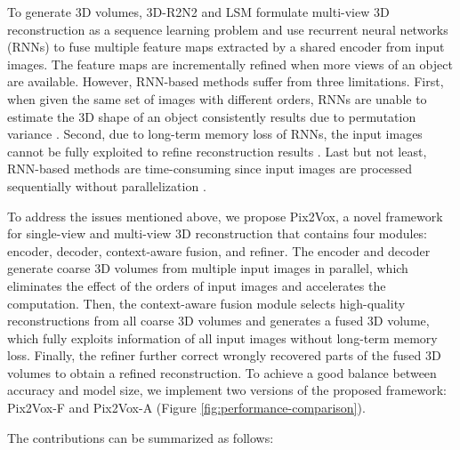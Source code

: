 \documentclass[10pt,twocolumn,letterpaper]{article}
\begin{document}
To generate 3D volumes, 3D-R2N2 \cite{DBLP:conf/eccv/ChoyXGCS16} and LSM \cite{DBLP:conf/nips/KarHM17} formulate multi-view 3D reconstruction as a sequence learning problem and use recurrent neural networks (RNNs) to fuse multiple feature maps extracted by a shared encoder from input images.
The feature maps are incrementally refined when more views of an object are available.
However, RNN-based methods suffer from three limitations.
First, when given the same set of images with different orders, RNNs are unable to estimate the 3D shape of an object consistently results due to permutation variance \cite{DBLP:conf/iclr/VinyalsBK16}.
Second, due to long-term memory loss of RNNs, the input images cannot be fully exploited to refine reconstruction results \cite{DBLP:conf/icml/PascanuMB13}.
Last but not least, RNN-based methods are time-consuming since input images are processed sequentially without parallelization \cite{DBLP:conf/icassp/HwangS15}.
 
To address the issues mentioned above, we propose Pix2Vox, a novel framework for single-view and multi-view 3D reconstruction that contains four modules: encoder, decoder, context-aware fusion, and refiner.
The encoder and decoder generate coarse 3D volumes from multiple input images in parallel, which eliminates the effect of the orders of input images and accelerates the computation.
Then, the context-aware fusion module selects high-quality reconstructions from all coarse 3D volumes and generates a fused 3D volume, which fully exploits information of all input images without long-term memory loss.
Finally, the refiner further correct wrongly recovered parts of the fused 3D volumes to obtain a refined reconstruction.
To achieve a good balance between accuracy and model size, we implement two versions of the proposed framework: Pix2Vox-F and Pix2Vox-A (Figure \ref{fig:performance-comparison}).

The contributions can be summarized as follows:
\end{document}
